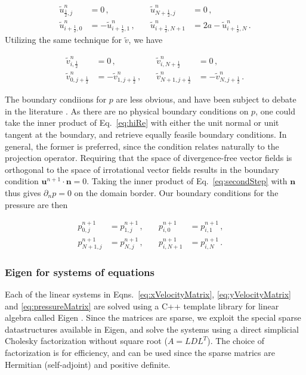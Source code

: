 \documentclass[final,3p,twocolumn]{elsarticle}
\begin{document}
\begin{align}
    \nonumber 
    \tilde{u}_{\frac{1}{2},j}^n &= 0 \,, &\quad \tilde{u}_{N + \frac{1}{2},j}^n
    &= 0 \,, \\
    \label{eq:xVelocityBCs}
    \tilde{u}_{i+\frac{1}{2},0}^n &= - \tilde{u}_{i+\frac{1}{2},1}^n \,, &\quad
    \tilde{u}_{i+\frac{1}{2},N+1}^n &= 2a - \tilde{u}_{i+\frac{1}{2},N}^n \,.
\end{align}
%
Utilizing the same technique for $\tilde{v}$, we have 

\begin{align}
    \nonumber
    \tilde{v}_{i,\frac{1}{2}}^n &= 0 \,, &\quad 
    \tilde{v}_{i, N + \frac{1}{2}}^n &= 0 \,, \\
    \label{eq:yVelocityBCs}
    \tilde{v}_{0, j+\frac{1}{2}}^n &= - \tilde{v}_{1, j+\frac{1}{2}}^n \,,
    &\quad \tilde{v}_{N+1, j+\frac{1}{2}}^n &= - \tilde{v}_{N, j+\frac{1}{2}}^n
    \,.
\end{align}

The boundary condiions for $p$ are less obvious, and have been subject to
debate in the literature \cite{liu1995projection}. As there are no physical
boundary conditions on $p$, one could take the inner product of Eq.\
\eqref{eq:hiRe} with either the unit normal or unit tangent at the boundary,
and retrieve equally feasile boundary conditions. In general, the former is
preferred, since the condition relates naturally to the projection operator.
Requiring that the space of divergence-free vector fields is orthogonal to the
space of irrotational vector fields results in the boundary condition
$\bm{u}^{n+1} \cdot \bm{n} = 0$. Taking the inner product of Eq.\
\eqref{eq:secondStep} with $\bm{n}$ thus gives $\partial_n p = 0$ on the domain
border. Our boundary conditions for the pressure are then

\begin{align}
    \nonumber
    p_{0,j}^{n+1} &= p_{1,j}^{n+1} \,, &\quad p_{i,0}^{n+1} &= p_{i,1}^{n+1}
    \,, \quad \\
    \label{eq:pressureBCs}
    p_{N+1,j}^{n+1} &= p_{N,j}^{n+1} \,, &\quad p_{i,N+1}^{n+1} &=
    p_{i,N}^{n+1} \,.
\end{align}

\subsubsection{Eigen for systems of equations}

Each of the linear systems in Eqns.\ \eqref{eq:xVelocityMatrix},
\eqref{eq:yVelocityMatrix} and \eqref{eq:pressureMatrix} are solved using a C++
template library for linear algebra called Eigen \cite{eigenweb}. Since the
matrices are sparse, we exploit the special sparse datastructures available in
Eigen, and solve the systems using a direct simplicial Cholesky factorization
without square root ($A=LDL^T$). The choice of factorization is for efficiency,
and can be used since the sparse matrics are Hermitian (self-adjoint) and
positive definite. 
\end{document}
